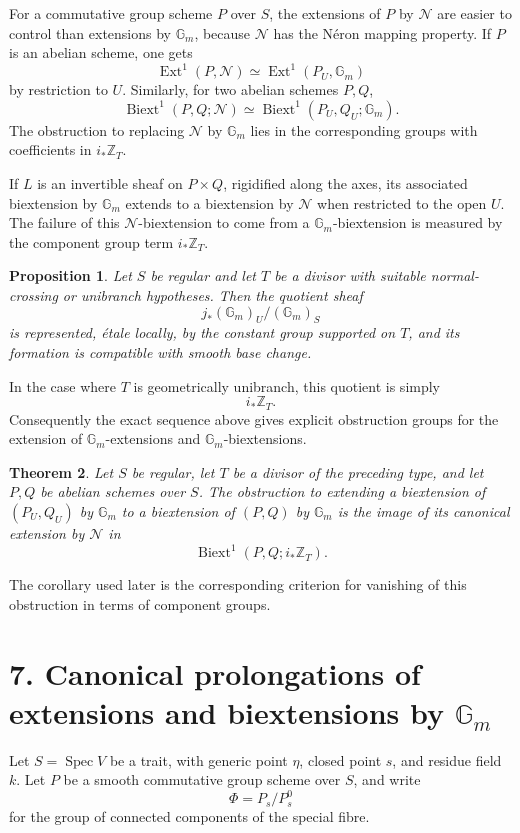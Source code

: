 \documentclass[11pt]{article}
\newtheorem{proposition}{Proposition}[section]
\newtheorem{theorem}[proposition]{Theorem}
\newcommand{\bZ}{\mathbb Z}
\newcommand{\Gm}{\mathbb G_m}
\newcommand{\Ext}{\operatorname{Ext}}
\newcommand{\Biext}{\operatorname{Biext}}
\newcommand{\Spec}{\operatorname{Spec}}
\begin{document}
For a commutative group scheme \(P\) over \(S\), the extensions of \(P\) by
\(\mathcal N\) are easier to control than extensions by \(\Gm\), because
\(\mathcal N\) has the Néron mapping property. If \(P\) is an abelian scheme, one
gets
\[
\Ext^1(P,\mathcal N)\simeq \Ext^1(P_U,\Gm)
\]
by restriction to \(U\). Similarly, for two abelian schemes \(P,Q\),
\[
\Biext^1(P,Q;\mathcal N)\simeq \Biext^1(P_U,Q_U;\Gm).
\]
The obstruction to replacing \(\mathcal N\) by \(\Gm\) lies in the
corresponding groups with coefficients in \(i_*\bZ_T\).

If \(L\) is an invertible sheaf on \(P\times Q\), rigidified along the axes, its
associated biextension by \(\Gm\) extends to a biextension by \(\mathcal N\) when
restricted to the open \(U\). The failure of this \(\mathcal N\)-biextension to
come from a \(\Gm\)-biextension is measured by the component group term
\(i_*\bZ_T\).

\begin{proposition}
Let \(S\) be regular and let \(T\) be a divisor with suitable normal-crossing or
unibranch hypotheses. Then the quotient sheaf
\[
j_*(\Gm)_U/(\Gm)_S
\]
is represented, étale locally, by the constant group supported on \(T\), and its
formation is compatible with smooth base change.
\end{proposition}

In the case where \(T\) is geometrically unibranch, this quotient is simply
\[
i_*\bZ_T.
\]
Consequently the exact sequence above gives explicit obstruction groups for the
extension of \(\Gm\)-extensions and \(\Gm\)-biextensions.

\begin{theorem}
Let \(S\) be regular, let \(T\) be a divisor of the preceding type, and let
\(P,Q\) be abelian schemes over \(S\). The obstruction to extending a
biextension of \((P_U,Q_U)\) by \(\Gm\) to a biextension of \((P,Q)\) by
\(\Gm\) is the image of its canonical extension by \(\mathcal N\) in
\[
\Biext^1(P,Q;i_*\bZ_T).
\]
\end{theorem}

The corollary used later is the corresponding criterion for vanishing of this
obstruction in terms of component groups.

\section*{7. Canonical prolongations of extensions and biextensions by \(\Gm\)}

Let \(S=\Spec V\) be a trait, with generic point \(\eta\), closed point \(s\),
and residue field \(k\). Let \(P\) be a smooth commutative group scheme over
\(S\), and write
\[
\Phi=P_s/P_s^0
\]
for the group of connected components of the special fibre.
\end{document}
